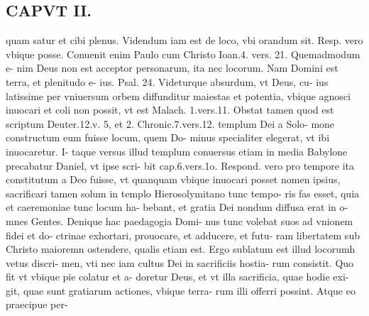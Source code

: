 \documentclass{article}
\begin{document}
\begin{pages}
\section*{CAPVT  II. }
\marginpar{[ p.67 ]}\pstart quam satur et cibi plenus. Videndum iam est de loco, vbi orandum sit. Resp. vero vbique posse. Conuenit enim Paulo cum Christo Ioan.4. vers. 21. Quemadmodum e- nim Deus non est acceptor personarum, ita nec locorum. Nam Domini est terra, et plenitudo e- ius. Psal. 24. Videturque absurdum, vt Deus, cu- ius latissime per vniuersum orbem diffunditur maiestas et potentia, vbique agnosci inuocari et coli non possit, vt est Malach. 1.vers.11. Obstat tamen quod est scriptum Deuter.12.v. 5, et 2. Chronic.7.vers.12. templum Dei a Solo- mone constructum eum fuisse locum, quem Do- minus specialiter elegerat, vt ibi inuocaretur. I- taque versus illud templum conuersus etiam in media Babylone precabatur Daniel, vt ipse scri- bit cap.6.vers.1o. Respond. vero pro tempore ita constitutum a Deo fuisse, vt quanquam vbique inuocari posset nomen ipsius, sacrificari tamen solum in templo Hierosolymitano tunc tempo- ris fas esset, quia et caeremoniae tunc locum ha- bebant, et gratia Dei nondum diffusa erat in o- mnes Gentes. Denique hac paedagogia Domi- nus tunc volebat suos ad vnionem fidei et do- ctrinae exhortari, prouocare, et adducere, et futu- ram libertatem sub Christo maioremn ostendere, qualis etiam est. Ergo sublatum est illud locorumh vetus discri- men, vti nec iam cultus Dei in sacrificiis hostia- rum consistit. Quo fit vt vbique pie colatur et a- doretur Deus, et vt illa sacrificia, quae hodie exi- git, quae sunt gratiarum actiones, vbique terra- rum illi offerri possint. Atque eo praecipue per-  \pend

\end{pages}
\end{document}
